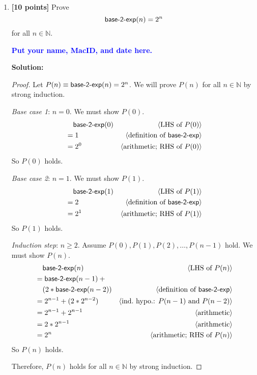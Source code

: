 \documentclass[11pt,fleqn]{article}
\newcommand{\mname}[1]{\mbox{\sf #1}}
\newcommand{\pnote}[1]{{\langle \text{#1} \rangle}}
\begin{document}
\begin{enumerate}
\begin{proof}
Therefore, $P(n)$ holds for all $n \in \mathbb{N}$ by weak induction.
\end{proof}

  \bigskip

  \item \textbf{[10 points]} Prove \[\mname{base-2-exp}(n) = 2^n\] for
    all $n \in \mathbb{N}$.

  \bigskip

  \textcolor{blue}{\textbf{Put your name, MacID, and date here.}}

  \bigskip

  \textbf{Solution:}

\begin{proof}
Let $P(n) \equiv \mname{base-2-exp}(n) = 2^n$.  We will prove $P(n)$
for all $n \in \mathbb{N}$ by strong induction.

\medskip

\emph{Base case 1}: $n = 0$.  We must show $P(0)$.
\begin{align*}
  &\phantom{{}=} \mname{base-2-exp}(0) & \pnote{LHS of $P(0)$}\\
  &= 1   & \pnote{definition of \mname{base-2-exp}}\\
  &= 2^0 & \pnote{arithmetic; RHS of $P(0)$}
\end{align*}
So $P(0)$ holds.

\medskip

\emph{Base case 2}: $n = 1$.  We must show $P(1)$.
\begin{align*}
  &\phantom{{}=} \mname{base-2-exp}(1) & \pnote{LHS of $P(1)$}\\
  &= 2   & \pnote{definition of \mname{base-2-exp}}\\
  &= 2^1 & \pnote{arithmetic; RHS of $P(1)$}
\end{align*}
So $P(1)$ holds.

\medskip

\emph{Induction step}: $n \ge 2$. Assume $P(0), P(1), P(2),\ldots,
P(n-1)$ hold. We must show $P(n)$.
\begin{align*}
  &\phantom{{}=} \mname{base-2-exp}(n) & \pnote{LHS of $P(n)$}\\
  &= \mname{base-2-exp}(n-1) + \phantom{x} &\\
  &\phantom{{}=} (2 * \mname{base-2-exp}(n-2)) & \pnote{definition of \mname{base-2-exp}}\\
  &= 2^{n-1} + (2 * 2^{n-2}) & \pnote{ind.\ hypo.: $P(n-1)$ and $P(n-2)$}\\
  &= 2^{n-1} + 2^{n-1}       & \pnote{arithmetic}\\
  &= 2*2^{n-1}              & \pnote{arithmetic}\\
  &= 2^{n}                  & \pnote{arithmetic; RHS of $P(n)$}
\end{align*}
So $P(n)$ holds.

\medskip

Therefore, $P(n)$ holds for all $n \in \mathbb{N}$ by strong induction.
\end{proof}

\end{enumerate}
\end{document}
